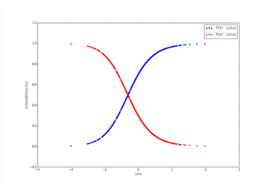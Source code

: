 \documentclass[letter, titlepage, 10pt]{article}
\begin{document}
\begin{appendices}
\begin{figure}
    \begin{minipage}{.5\textwidth}
        \centering
        \includegraphics[width=1\linewidth]{images/CP_D8}
    \end{minipage}

\end{figure}




\end{appendices}


\end{document}
